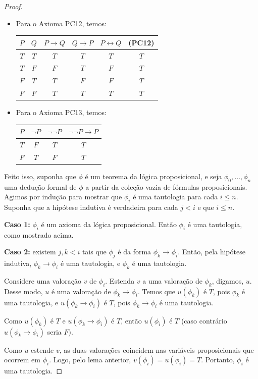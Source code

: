 \begin{proof}
\begin{itemize}
\begin{center}
        \end{center}
        \item Para o Axioma PC12, temos:
        \begin{center}
            \begin{tabular}{c|c|c|c|c|c}
                $P$ & $Q$ & $P \rightarrow Q$ & $Q \rightarrow P$ & $P \leftrightarrow Q$ & (PC12) \\
                \hline
                $T$ & $T$ & $T$ & $T$ & $T$ & $T$ \\
                $T$ & $F$ & $F$ & $T$ & $F$ & $T$ \\
                $F$ & $T$ & $T$ & $F$ & $F$ & $T$ \\
                $F$ & $F$ & $T$ & $T$ & $T$ & $T$
            \end{tabular}
        \end{center}
        \item Para o Axioma PC13, temos:
        \begin{center}
            \begin{tabular}{c|c|c|c}
                $P$ & $\neg P$ & $\neg\neg P$ & $\neg\neg P \rightarrow P$ \\
                \hline
                $T$ & $F$ & $T$ & $T$ \\
                $F$ & $T$ & $F$ & $T$
            \end{tabular}
        \end{center}
    \end{itemize}

    Feito isso, suponha que $\phi$ é um teorema da lógica proposicional, e seja $\phi_0, \dots, \phi_n$ uma dedução formal de $\phi$ a partir da coleção vazia de fórmulas proposicionais.
    Agimos por indução para mostrar que $\phi_i$ é uma tautologia para cada $i\leq n$.
    Suponha que a hipótese indutiva é verdadeira para cada $j < i$ e que $i\leq n$.

    \textbf{Caso 1:} $\phi_i$ é um axioma da lógica proposicional.
    Então $\phi_i$ é uma tautologia, como mostrado acima.

    \textbf{Caso 2:} existem $j, k < i$ tais que $\phi_j$ é da forma $\phi_k \rightarrow \phi_i$.
    Então, pela hipótese indutiva, $\phi_k\rightarrow \phi_i$ é uma tautologia, e $\phi_k$ é uma tautologia.
    
    Considere uma valoração $v$ de $\phi_i$.
    Estenda $v$ a uma valoração de $\phi_k$, digamos, $u$.
    Desse modo, $u$ é uma valoração de $\phi_k\rightarrow \phi_i$.
    Temos que $u(\phi_k)$ é $T$, pois $\phi_k$ é uma tautologia, e $u(\phi_k\rightarrow \phi_i)$ é $T$, pois $\phi_k\rightarrow \phi_i$ é uma tautologia.

    Como $u(\phi_k)$ é $T$ e $u(\phi_k\rightarrow \phi_i)$ é $T$, então $u(\phi_i)$ é $T$ (caso contrário $u(\phi_k\rightarrow \phi_i)$ seria $F$).

    Como $u$ estende $v$, as duas valorações coincidem nas variáveis proposicionais que ocorrem em $\phi_i$.
    Logo, pelo lema anterior, $v(\phi_i)=u(\phi_i)=T$.
    Portanto, $\phi_i$ é uma tautologia.
\end{proof}

